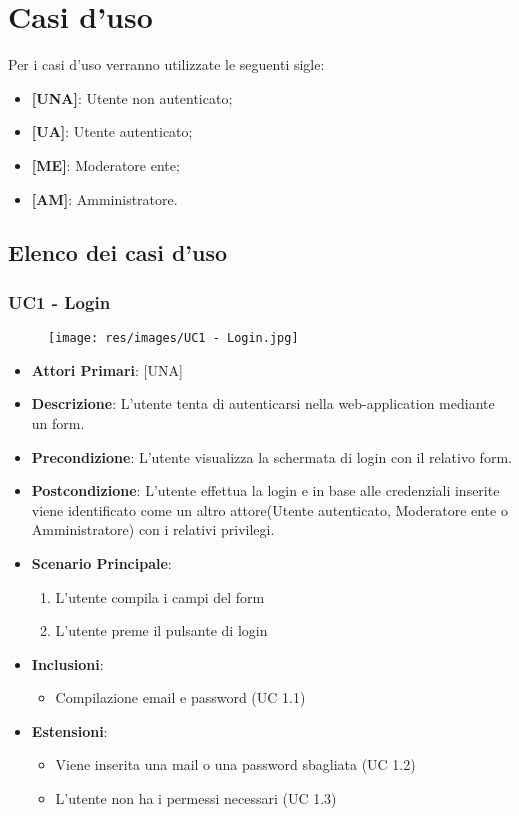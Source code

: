 \section{Casi d'uso}
	Per i casi d'uso verranno utilizzate le seguenti sigle:
	\begin{itemize}
		\item \textbf{[UNA]}: Utente non autenticato;
		\item \textbf{[UA]}: Utente autenticato;
		\item \textbf{[ME]}: Moderatore ente;
		\item \textbf{[AM]}: Amministratore.
	\end{itemize}
	\subsection{Elenco dei casi d'uso}

		\subsubsection{UC1 - Login}
		
		\begin{figure}[t!]
			\centering
			\texttt{[image: res/images/UC1 - Login.jpg]}
		\end{figure}
		
		\begin{itemize}
			\item \textbf{Attori Primari}: [UNA]
			\item \textbf{Descrizione}: L'utente tenta di autenticarsi nella web-application mediante un form.
			\item \textbf{Precondizione}: L'utente visualizza la schermata di login con il relativo form.
			\item \textbf{Postcondizione}: L'utente effettua la login e in base alle credenziali inserite viene identificato come un altro attore(Utente autenticato, Moderatore ente o Amministratore) con i relativi privilegi.
			\item \textbf{Scenario Principale}:
			\begin{enumerate}
				\item{L'utente compila i campi del form}
				\item{L'utente preme il pulsante di login}
			\end{enumerate}
			\item \textbf{Inclusioni}:
				\begin{itemize}
					\item Compilazione email e password (UC 1.1)
				\end{itemize}
			\item \textbf{Estensioni}:
				\begin{itemize}
					\item Viene inserita una mail o una password sbagliata (UC 1.2)
					\item L'utente non ha i permessi necessari  (UC 1.3)
				\end{itemize}

		\end{itemize}

